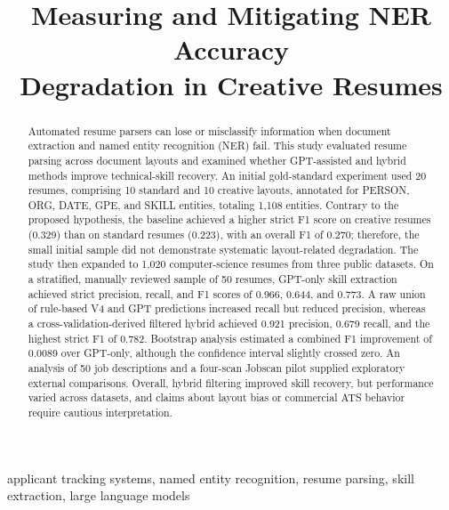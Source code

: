 \documentclass[conference]{IEEEtran}
\begin{document}
\title{Measuring and Mitigating NER Accuracy\\
Degradation in Creative Resumes}

\author{
}

\maketitle

\begin{abstract}
Automated resume parsers can lose or misclassify information when document extraction and named entity recognition (NER) fail. This study evaluated resume parsing across document layouts and examined whether GPT-assisted and hybrid methods improve technical-skill recovery. An initial gold-standard experiment used 20 resumes, comprising 10 standard and 10 creative layouts, annotated for PERSON, ORG, DATE, GPE, and SKILL entities, totaling 1,108 entities. Contrary to the proposed hypothesis, the baseline achieved a higher strict F1 score on creative resumes (0.329) than on standard resumes (0.223), with an overall F1 of 0.270; therefore, the small initial sample did not demonstrate systematic layout-related degradation. The study then expanded to 1,020 computer-science resumes from three public datasets. On a stratified, manually reviewed sample of 50 resumes, GPT-only skill extraction achieved strict precision, recall, and F1 scores of 0.966, 0.644, and 0.773. A raw union of rule-based V4 and GPT predictions increased recall but reduced precision, whereas a cross-validation-derived filtered hybrid achieved 0.921 precision, 0.679 recall, and the highest strict F1 of 0.782. Bootstrap analysis estimated a combined F1 improvement of 0.0089 over GPT-only, although the confidence interval slightly crossed zero. An analysis of 50 job descriptions and a four-scan Jobscan pilot supplied exploratory external comparisons. Overall, hybrid filtering improved skill recovery, but performance varied across datasets, and claims about layout bias or commercial ATS behavior require cautious interpretation.
\end{abstract}

\begin{IEEEkeywords}
applicant tracking systems, named entity recognition, resume parsing, skill extraction, large language models
\end{IEEEkeywords}
\end{document}
